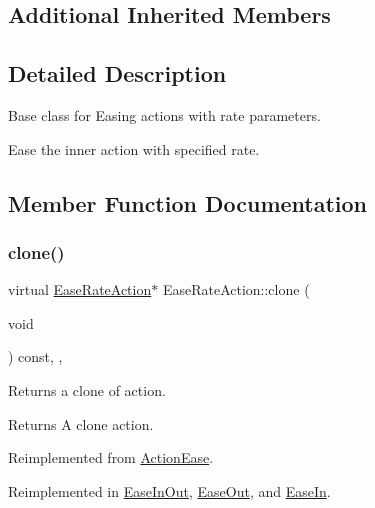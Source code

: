 \subsection*{Additional Inherited Members}


\subsection{Detailed Description}
Base class for Easing actions with rate parameters. 

Ease the inner action with specified rate. 

\subsection{Member Function Documentation}
\mbox{\label{classEaseRateAction_a50323a94f7587203d7b02bb66fe2e67e}} 
\subsubsection{\texorpdfstring{clone()}{clone()}}
{\footnotesize\ttfamily virtual \hyperlink{classEaseRateAction}{Ease\+Rate\+Action}$\ast$ Ease\+Rate\+Action\+::clone (\begin{DoxyParamCaption}\item[{void}]{ }\end{DoxyParamCaption}) const\hspace{0.3cm}{\ttfamily [inline]}, {\ttfamily [override]}, {\ttfamily [virtual]}}

Returns a clone of action.

\begin{DoxyReturn}{Returns}
A clone action. 
\end{DoxyReturn}


Reimplemented from \hyperlink{classActionEase_a39bec93fe161fb732a74d8e51a2fe08b}{Action\+Ease}.



Reimplemented in \hyperlink{classEaseInOut_a5bee2d31db0c1fefd2656c8eedd5831e}{Ease\+In\+Out}, \hyperlink{classEaseOut_aaa3ddcdc100a3378279054d596e87178}{Ease\+Out}, and \hyperlink{classEaseIn_ac2db345fad4b62fa8485e6d40121a83c}{Ease\+In}.

\mbox{\label{classEaseRateAction_a94d1d8c5c219f82bbb15e31eea82ef99}} 
